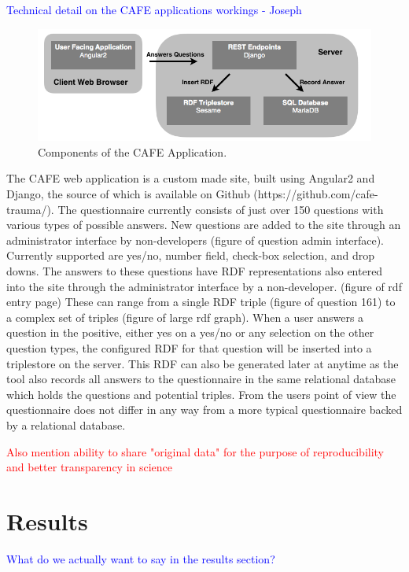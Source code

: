 \documentclass{amia}
\begin{document}
\textcolor{blue}{Technical detail on the CAFE applications workings - Joseph}

\begin{figure}[h!]
  \centering
  \includegraphics[width=1\textwidth]{pics/cafe_process.png}
  \caption{Components of the CAFE Application.}
  \label{cafe_process}
\end{figure}

The CAFE web application is a custom made site, built using Angular2 and Django, the source of which is available on Github (https://github.com/cafe-trauma/).
The questionnaire currently consists of just over 150 questions with various types of possible answers.
New questions are added to the site through an administrator interface by non-developers (figure of question admin interface).
Currently supported are yes/no, number field, check-box selection, and drop downs.
The answers to these questions have RDF representations also entered into the site through the administrator interface by a non-developer. (figure of rdf entry page)
These can range from a single RDF triple (figure of question 161) to a complex set of triples (figure of large rdf graph).
When a user answers a question in the positive, either yes on a yes/no or any selection on the other question types, the configured RDF for that question will be inserted into a triplestore on the server.
This RDF can also be generated later at anytime as the tool also records all answers to the questionnaire in the same relational database which holds the questions and potential triples.
From the users point of view the questionnaire does not differ in any way from a more typical questionnaire backed by a relational database.


\textcolor{red}{Also mention ability to share "original data" for the purpose of reproducibility and better transparency in science}

\section*{Results}
\textcolor{blue}{What do we actually want to say in the results section?}
\end{document}
